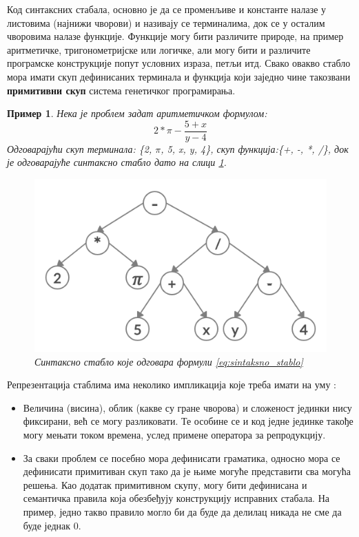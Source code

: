 \documentclass[a4paper]{article}
\newtheorem{primer}{Пример}[section] %
\begin{document}
Код синтаксних стабала, основно је да се променљиве и константе налазе у листовима (најнижи чворови) и називају се терминалима, док се у осталим чворовима налазе функције. Функције могу бити различите природе, на пример аритметичке, тригонометријске или логичке, али могу бити и различите програмске конструкције попут условних израза, петљи итд. Свако овакво стабло мора имати скуп дефинисаних терминала и функција који заједно чине такозвани \textbf{примитивни скуп} система генетичког програмирања. 

\begin{primer}
    Нека је проблем задат аритметичком формулом: 
    \begin{equation} 
        \label{eq:sintaksno_stablo}
        2*\pi-\frac{5+x}{y-4}
    \end{equation}
    Одговарајући скуп терминала: \{2, $\pi$, 5, x, y, 4\}, скуп функција:\newline \{+, -, *, /\}, док је одговарајуће синтаксно стабло дато на слици \ref{fig:sintaksno_stablo}.

    \begin{figure}[h!]
        \begin{center}
        \includegraphics[scale=0.22]{sintaksnoStablo.png}
        \end{center}
        \caption{Синтаксно стабло које одговара формули \ref{eq:sintaksno_stablo}}
        \label{fig:sintaksno_stablo}
    \end{figure}
\end{primer}


Репрезентација стаблима има неколико импликација које треба имати на уму \cite{compIntelligence}:
\begin{itemize}
    \item Величина (висина), облик (какве су гране чворова) и сложеност јединки нису фиксирани, већ се могу разликовати. Те особине се и код једне јединке такође могу мењати током времена, услед примене оператора за репродукцију.
    \item За сваки проблем се посебно мора дефинисати граматика, односно мора се дефинисати примитиван скуп тако да је њиме могуће представити сва могућа решења. Као додатак примитивном скупу, могу бити дефинисана и семантичка правила која обезбеђују конструкцију исправних стабала. На пример, једно такво правило могло би да буде да делилац никада не сме да буде једнак 0.
\end{itemize}
\end{document}
